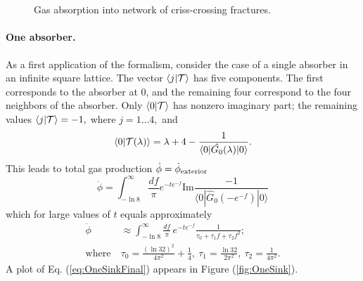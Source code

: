 \documentclass[english,notitlepage,twocolumn]{revtex4-1}
\begin{document}
\begin{figure}
 \\
\\
\caption{Gas absorption into network of criss-crossing fractures. \label{fig:Gas-absorption-produced}}
\end{figure}

\paragraph{One absorber.}

As a first application of the formalism, consider the case of a single
absorber in an infinite square lattice. The vector $\langle j|{\cal T\rangle}$
has five components. The first corresponds to the absorber at 0, and
the remaining four correspond to the four neighbors of the absorber.
Only $\langle0|{\cal T}\rangle$ has nonzero imaginary part; the remaining
values $\langle j|{\cal T}\rangle=-1,$ where $j=1\dots4,$ and
\begin{equation}
\langle0|{\cal T}(\lambda)\rangle=\lambda+4-\frac{1}{\langle0|\hat{G_{0}}(\lambda)|0\rangle}.\label{eq:tt0}
\end{equation}
This leads to total gas production $\dot{\phi}=\dot{\phi}_{{\rm exterior}}$
\begin{equation}
\dot{\phi}=\int_{-\ln8}^{\infty}\frac{df}{\pi}e^{-te^{-f}}\text{Im}\frac{-1}{\langle0|\hat{G}_{0}(-e^{-f})|0\rangle}\label{eq:OneSinkFinal}
\end{equation}
which for large values of $t$ equals approximately
\begin{align}
\dot{\phi} & \approx\int_{-\ln8}^{\infty}\frac{df}{\pi}\,e^{-te^{-f}}\frac{1}{\tau_{0}+\tau_{1}f+\tau_{2}f^{2}};\label{eq:asymp}\\
\text{where}\  & \tau_{0}=\frac{\left(\ln32\right)^{2}}{4\pi^{2}}+\frac{1}{4},\ \tau_{1}=\frac{\ln32}{2\pi^{2}},\ \tau_{2}=\frac{1}{4\pi^{2}}.\nonumber 
\end{align}
A plot of Eq. (\ref{eq:OneSinkFinal}) appears in Figure (\ref{fig:OneSink}).
\end{document}
